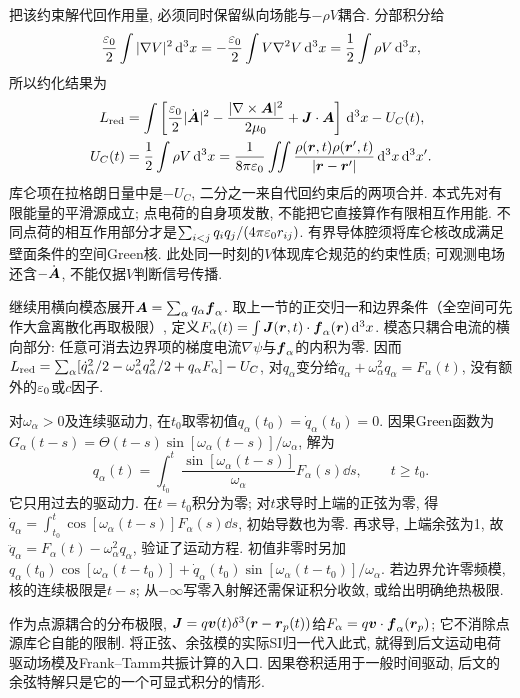 把该约束解代回作用量, 必须同时保留纵向场能与$-\rho V$耦合. 分部积分给
\[
\frac{\varepsilon_0}{2}\int|\nabla V|^2\,\mathrm d^3x
=-\frac{\varepsilon_0}{2}\int V\nabla^2V\,\mathrm d^3x
=\frac12\int\rho V\,\mathrm d^3x,
\]
所以约化结果为
\begin{align*}
L_{\rm red}&=\int\left[\frac{\varepsilon_0}{2}|\dot{\boldsymbol{A}}|^2
-\frac{|\nabla\times\boldsymbol{A}|^2}{2\mu_0}+\boldsymbol{J}\cdot\boldsymbol{A}\right]\,\mathrm d^3x-U_C(t),\\
U_C(t)&=\frac12\int\rho V\,\mathrm d^3x
=\frac1{8\pi\varepsilon_0}\iint\frac{\rho(\boldsymbol{r},t)\rho(\boldsymbol{r}',t)}{|\boldsymbol{r}-\boldsymbol{r}'|}\,\mathrm d^3x\,\mathrm d^3x'.
\end{align*}
库仑项在拉格朗日量中是$-U_C$, 二分之一来自代回约束后的两项合并. 本式先对有限能量的平滑源成立; 点电荷的自身项发散, 不能把它直接算作有限相互作用能. 不同点荷的相互作用部分才是$\sum_{i<j}q_iq_j/(4\pi\varepsilon_0 r_{ij})$. 有界导体腔须将库仑核改成满足壁面条件的空间Green核. 此处同一时刻的$V$体现库仑规范的约束性质; 可观测电场还含$-\dot{\boldsymbol{A}}$, 不能仅据$V$判断信号传播.

继续用横向模态展开$\boldsymbol{A}=\sum_\alpha q_\alpha\boldsymbol{f}_\alpha$. 取上一节的正交归一和边界条件（全空间可先作大盒离散化再取极限）, 定义$F_\alpha(t)=\int\boldsymbol{J}(\boldsymbol{r},t)\cdot\boldsymbol{f}_\alpha(\boldsymbol{r})\,\mathrm d^3x$. 模态只耦合电流的横向部分: 任意可消去边界项的梯度电流$\nabla\psi$与$\boldsymbol{f}_\alpha$的内积为零. 因而
$L_{\rm red}=\sum_\alpha[\dot q_\alpha^2/2-\omega_\alpha^2q_\alpha^2/2+q_\alpha F_\alpha]-U_C$,
对$q_\alpha$变分给$\ddot q_\alpha+\omega_\alpha^2q_\alpha=F_\alpha(t)$, 没有额外的$\varepsilon_0$或$c$因子.

对$\omega_\alpha>0$及连续驱动力, 在$t_0$取零初值$q_\alpha(t_0)=\dot q_\alpha(t_0)=0$. 因果Green函数为$G_\alpha(t-s)=\Theta(t-s)\sin[\omega_\alpha(t-s)]/\omega_\alpha$, 解为
\[
q_\alpha(t)=\int_{t_0}^{t}\frac{\sin[\omega_\alpha(t-s)]}{\omega_\alpha}F_\alpha(s)\dd s,
\qquad t\ge t_0.
\]
它只用过去的驱动力. 在$t=t_0$积分为零; 对$t$求导时上端的正弦为零, 得$\dot q_\alpha=\int_{t_0}^t\cos[\omega_\alpha(t-s)]F_\alpha(s)\dd s$, 初始导数也为零. 再求导, 上端余弦为1, 故$\ddot q_\alpha=F_\alpha(t)-\omega_\alpha^2q_\alpha$, 验证了运动方程. 初值非零时另加$q_\alpha(t_0)\cos[\omega_\alpha(t-t_0)]+\dot q_\alpha(t_0)\sin[\omega_\alpha(t-t_0)]/\omega_\alpha$. 若边界允许零频模, 核的连续极限是$t-s$; 从$-\infty$写零入射解还需保证积分收敛, 或给出明确绝热极限.

作为点源耦合的分布极限, $\boldsymbol{J}=q\boldsymbol{v}(t)\delta^3(\boldsymbol{r}-\boldsymbol{r}_p(t))$给$F_\alpha=q\boldsymbol{v}\cdot\boldsymbol{f}_\alpha(\boldsymbol{r}_p)$; 它不消除点源库仑自能的限制. 将正弦、余弦模的实际SI归一代入此式, 就得到后文运动电荷驱动场模及Frank--Tamm共振计算的入口. 因果卷积适用于一般时间驱动, 后文的余弦特解只是它的一个可显式积分的情形.

